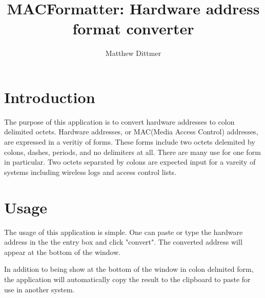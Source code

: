 \documentclass[10pt,a4paper,draft]{report}
\author{Matthew Dittmer}
\title{MACFormatter: Hardware address format converter}
\begin{document}
\maketitle
\chapter*{Introduction}

The purpose of this application is to convert hardware addresses to colon delimited octets.  Hardware addresses, or MAC(Media Access Control) addresses, are expressed in a veritiy of forms.  These forms include two octets delemited by colons, dashes, periods, and no delimiters at all.  There are many use for one form in particular.  Two octets separated by colons are expected input for a vareity of systems including wireless logs and access control lists.

\chapter*{Usage}

The usage of this application is simple.  One can paste or type the hardware address in the the entry box and click "convert".  The converted address will appear at the bottom of the window.

In addition to being show at the bottom of the window in colon delmited form, the application will automatically copy the result to the clipboard to paste for use in another system.
\end{document}
